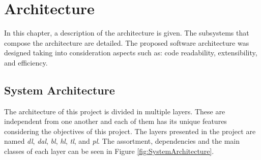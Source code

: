 \chapter{Architecture}
\label{Architecture}
\thispagestyle{plain}

In this chapter, a description of the architecture is given. The subsystems that compose the architecture are detailed. The proposed software architecture was designed taking into consideration aspects such as: code readability, extensibility, and efficiency.

\section{System Architecture}

The architecture of this project is divided in multiple layers. These are independent from one another and each of them has its unique features considering the objectives of this project. The layers presented in the project are named \textit{\gls{dl}}, \textit{\gls{dal}}, \textit{\gls{bl}}, \textit{\gls{hl}}, \textit{\gls{tl}}, and \textit{\gls{pl}}. The assortment, dependencies and the main classes of each layer can be seen in Figure \ref{fig:SystemArchitecture}.


